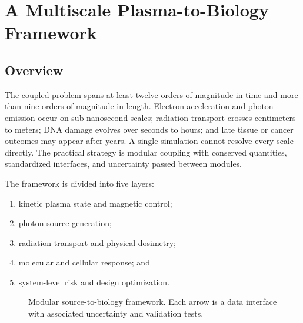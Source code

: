 \chapter{A Multiscale Plasma-to-Biology Framework}
\label{ch:framework}

\section{Overview}

The coupled problem spans at least twelve orders of magnitude in time and more than nine orders of magnitude in length. Electron acceleration and photon emission occur on sub-nanosecond scales; radiation transport crosses centimeters to meters; DNA damage evolves over seconds to hours; and late tissue or cancer outcomes may appear after years. A single simulation cannot resolve every scale directly. The practical strategy is modular coupling with conserved quantities, standardized interfaces, and uncertainty passed between modules.

The framework is divided into five layers:
\begin{enumerate}
\item kinetic plasma state and magnetic control;
\item photon source generation;
\item radiation transport and physical dosimetry;
\item molecular and cellular response; and
\item system-level risk and design optimization.
\end{enumerate}

\begin{figure}[H]
\centering
{}
\caption{Modular source-to-biology framework. Each arrow is a data interface with associated uncertainty and validation tests.}
\label{fig:framework}
\end{figure}

